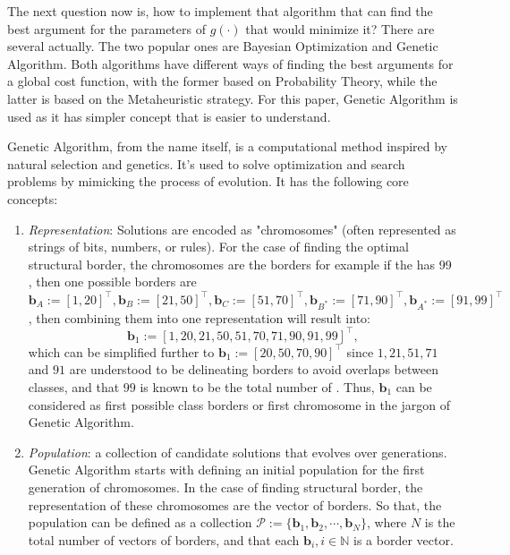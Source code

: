 The next question now is, how to implement that algorithm that can find the best argument for the parameters of $g(\cdot)$ that would minimize it? There are several actually. The two popular ones are Bayesian Optimization and Genetic Algorithm. Both algorithms have different ways of finding the best arguments for a global cost function, with the former based on Probability Theory, while the latter is based on the Metaheuristic strategy. For this paper, Genetic Algorithm is used as it has simpler concept that is easier to understand.

Genetic Algorithm, from the name itself, is a computational method inspired by natural selection and genetics. It's used to solve optimization and search problems by mimicking the process of evolution. It has the following core concepts: 
\begin{enumerate}
    \item \textit{Representation}: Solutions are encoded as "chromosomes" (often represented as strings of bits, numbers, or rules). For the case of finding the optimal structural border, the chromosomes are the borders for example if the   has 99  , then one possible borders are $\mathbf{b}_A:=[1, 20]^{\top}, \mathbf{b}_B:=[21,50]^{\top}, \mathbf{b}_C:=[51,70]^{\top}, \mathbf{b}_{B^*}:=[71,90]^{\top}, \mathbf{b}_{A^*}:=[91,99]^{\top}$, then combining them into one representation will result into:
    \begin{equation}
        \mathbf{b}_{1}:=[1,20,21,50,51,70,71,90,91,99]^{\top},
    \end{equation}
    which can be simplified further to $\mathbf{b}_1:=[20,50,70,90]^{\top}$ since $1, 21,51,71$ and $91$ are understood to be delineating borders to avoid overlaps between classes, and that $99$ is known to be the total number of  . Thus, $\mathbf{b}_1$ can be considered as first possible class borders or first chromosome in the jargon of Genetic Algorithm.
    \item \textit{Population}: a collection of candidate solutions that evolves over generations. Genetic Algorithm starts with defining an initial population for the first generation of chromosomes. In the case of finding structural border, the representation of these chromosomes are the vector of borders. So that, the population can be defined as a collection $\mathscr{P}:=\{\mathbf{b}_1,\mathbf{b}_2,\cdots,\mathbf{b}_N\}$, where $N$ is the total number of vectors of borders, and that each $\mathbf{b}_i,i\in\mathbb{N}$ is a border vector.

\end{enumerate}
